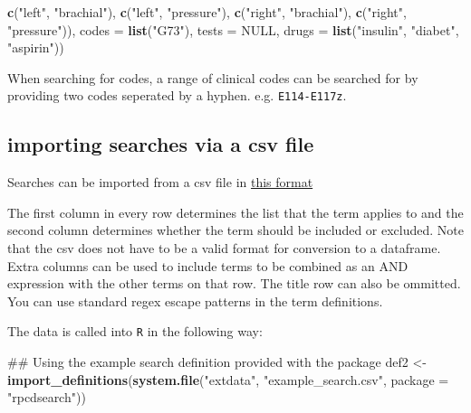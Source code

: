 \documentclass[]{article}
\newenvironment{Shaded}{\begin{snugshade}}{\end{snugshade}}
\newcommand{\KeywordTok}[1]{\textcolor[rgb]{0.13,0.29,0.53}{\textbf{{#1}}}}
\newcommand{\DataTypeTok}[1]{\textcolor[rgb]{0.13,0.29,0.53}{{#1}}}
\newcommand{\StringTok}[1]{\textcolor[rgb]{0.31,0.60,0.02}{{#1}}}
\newcommand{\OtherTok}[1]{\textcolor[rgb]{0.56,0.35,0.01}{{#1}}}
\newcommand{\NormalTok}[1]{{#1}}
\begin{document}
\begin{Shaded}
\begin{Highlighting}[]
                      \KeywordTok{c}\NormalTok{(}\StringTok{"left"}\NormalTok{, }\StringTok{"brachial"}\NormalTok{),}
                      \KeywordTok{c}\NormalTok{(}\StringTok{"left"}\NormalTok{, }\StringTok{"pressure"}\NormalTok{),}
                      \KeywordTok{c}\NormalTok{(}\StringTok{"right"}\NormalTok{, }\StringTok{"brachial"}\NormalTok{),}
                      \KeywordTok{c}\NormalTok{(}\StringTok{"right"}\NormalTok{, }\StringTok{"pressure"}\NormalTok{)),}
         \DataTypeTok{codes =} \KeywordTok{list}\NormalTok{(}\StringTok{"G73"}\NormalTok{),}
         \DataTypeTok{tests =} \OtherTok{NULL}\NormalTok{,}
         \DataTypeTok{drugs =} \KeywordTok{list}\NormalTok{(}\StringTok{"insulin"}\NormalTok{, }\StringTok{"diabet"}\NormalTok{, }\StringTok{"aspirin"}\NormalTok{))}
\end{Highlighting}
\end{Shaded}

When searching for codes, a range of clinical codes can be searched for
by providing two codes seperated by a hyphen. e.g. \texttt{E114-E117z}.

\subsection{importing searches via a csv
file}\label{importing-searches-via-a-csv-file}

Searches can be imported from a csv file in
\href{https://github.com/rOpenHealth/rpcdsearch/blob/master/inst/extdata/example_search.csv}{this
format}

The first column in every row determines the list that the term applies
to and the second column determines whether the term should be included
or excluded. Note that the csv does not have to be a valid format for
conversion to a dataframe. Extra columns can be used to include terms to
be combined as an AND expression with the other terms on that row. The
title row can also be ommitted. You can use standard regex escape
patterns in the term definitions.

The data is called into \texttt{R} in the following way:

\begin{Shaded}
\begin{Highlighting}[]
\NormalTok{## Using the example search definition provided with the package}
\NormalTok{def2 <-}\StringTok{ }\KeywordTok{import_definitions}\NormalTok{(}\KeywordTok{system.file}\NormalTok{(}\StringTok{"extdata"}\NormalTok{, }\StringTok{"example_search.csv"}\NormalTok{, }\DataTypeTok{package =} \StringTok{"rpcdsearch"}\NormalTok{))}
\end{Highlighting}
\end{Shaded}
\end{document}
